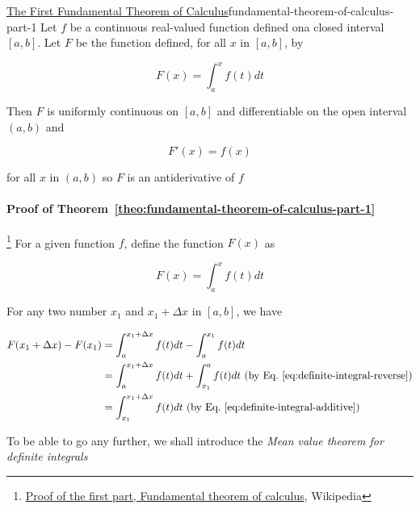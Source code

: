 \begin{Theorem}{\href{https://en.wikipedia.org/wiki/Fundamental\_theorem\_of\_calculus\#First\_part}{The First Fundamental Theorem of Calculus}}{fundamental-theorem-of-calculus-part-1}
    Let $f$ be a continuous real-valued function defined ona closed interval $[a, b]$. Let $F$ be the function defined,
    for all $x$ in $[a, b]$, by

    \begin{equation}
        F(x) = \int_a^x f(t) dt
    \end{equation}

    Then $F$ is uniformly continuous on $[a, b]$ and differentiable on the open interval $(a, b)$ and

    \begin{equation}
        F'(x) = f(x)
    \end{equation}

    for all $x$ in $(a, b)$ so $F$ is an antiderivative of $f$
\end{Theorem}

\paragraph{Proof of Theorem~\ref{theo:fundamental-theorem-of-calculus-part-1}}

\footnote{\href{https://en.wikipedia.org/wiki/Fundamental_theorem_of_calculus\#Proof\_of\_the\_first\_part}{Proof of the first part, Fundamental theorem of calculus}, Wikipedia}
For a given function $f$, define the function $F(x)$ as

\[
    F(x) = \int_a^x f(t) dt
\]

For any two number $x_1$ and $x_1 + \Delta x$ in $[a, b]$, we have

\begin{align}
    F(x_1 + \Delta x) - F(x_1) &= \int_a^{x_1 + \Delta x} f(t) dt - \int_a^{x_1} f(t) dt \\
    &= \int_a^{x_1 + \Delta x} f(t) dt + \int_{x_1}^a f(t) dt \text{ (by Eq.~\ref{eq:definite-integral-reverse})}\\
    &= \int_{x_1}^{x_1 + \Delta x} f(t)dt\label{eq:F-del-x-minus-F} \text{ (by Eq.~\ref{eq:definite-integral-additive})}
\end{align}

To be able to go any further, we shall introduce the \textit{Mean value theorem for definite integrals}

